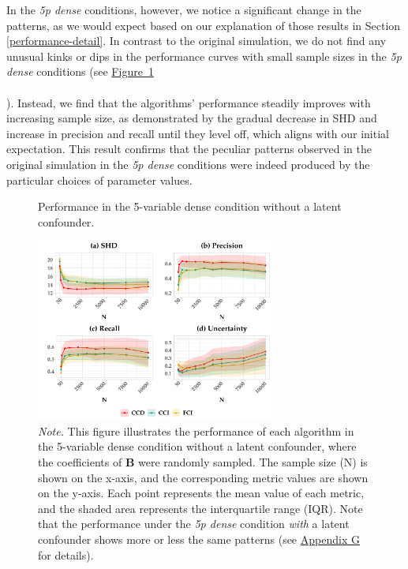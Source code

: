 \documentclass[twoside, 11pt]{article}
\newcommand*{\figref}[2][]{%
  \hyperref[{fig:#2}]{%
    Figure~\ref*{fig:#2}%
    \ifx\\#1\\%
    \else
      #1%
    \fi
  }%
}
\begin{document}
In the \textit{5p dense} conditions, however, we notice a significant change in the patterns, as we would expect based on our explanation of those results in Section \ref{performance-detail}. In contrast to the original simulation, we do not find any unusual kinks or dips in the performance curves with small sample sizes in the \textit{5p dense} conditions (see \figref[]{5pdense}). Instead, we find that the algorithms' performance steadily improves with increasing sample size, as demonstrated by the gradual decrease in SHD and increase in precision and recall until they level off, which aligns with our initial expectation.
This result confirms that the peculiar patterns observed in the original simulation in the \textit{5p dense} conditions were indeed produced by the particular choices of parameter values.

\begin{figure}[!t]
    \centering
        \caption{Performance in the 5-variable dense condition without a latent confounder.}
        \vspace{1mm}
        \includegraphics[width=0.7\textwidth]{figures/samplingbeta_dense5p.pdf}
        \caption*{\small{\textit{Note.} This figure illustrates the performance of each algorithm in the 5-variable dense condition without a latent confounder, where the coefficients of $\mathbf{B}$ were randomly sampled. The sample size (N) is shown on the x-axis, and the corresponding metric values are shown on the y-axis. Each point represents the mean value of each metric, and the shaded area represents the interquartile range (IQR). Note that the performance under the \textit{5p dense} condition \textit{with} a latent confounder shows more or less the same patterns (see \hyperref[varyingbeta]{Appendix G} for details).}}
    \label{fig:5pdense}
\end{figure}
\end{document}
